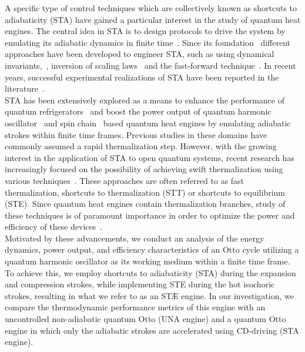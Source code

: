 \documentclass[aps,pra,twocolumn,showpacs,showkeys,groupedaddress,nobalancelastpage,nofootinbib,floatfix,superscriptaddress,longbibliography]{revtex4-2}
\begin{document}
A specific type of control techniques which are collectively known as shortcuts to adiabaticity (STA) have gained a particular interest in the study of quantum heat engines. The central idea in STA is to design protocols to drive the system by emulating its adiabatic dynamics in finite time~\cite{TORRONTEGUI2013117,RevModPhys.91.045001}. Since its foundation~\cite{doi:10.1021/jp030708a,doi:10.1021/jp040647w,Berry_2009,PhysRevLett.104.063002} different approaches have been developed to engineer STA, such as using dynamical invariants,~\cite{PhysRevLett.104.063002,PhysRevA.83.062116}, inversion of scaling laws~\cite{PhysRevA.84.031606,Campo2012} and the fast-forward technique~\cite{doi:10.1098/rspa.2009.0446,PhysRevA.84.043434,PhysRevA.86.013601}. In recent years, successful experimental realizations of STA have been reported in the literature~\cite{doi:10.1126/sciadv.aau5999,https://doi.org/10.1002/qute.201900121,PhysRevApplied.13.044059,Yin2022}.\\

STA has been extensively explored as a means to enhance the performance of quantum refrigerators~\cite{PhysRevB.100.035407,PhysRevResearch.2.023120} and boost the power output of quantum harmonic oscillator~\cite{Campo2014,PhysRevE.98.032121,PhysRevE.99.022110,e18050168} and spin chain~\cite{PhysRevE.99.032108,PhysRevResearch.2.023145,_AKMAK_2021} based quantum heat engines by emulating adiabatic strokes within finite time frames. Previous studies in these domains have commonly assumed a rapid thermalization step. However, with the growing interest in the application of STA to open quantum systems, recent research has increasingly focused on the possibility of achieving swift thermalization using various techniques~\cite{PhysRevA.98.052129,PhysRevLett.122.250402,PhysRevA.100.012126,Alipour2020shortcutsto,PhysRevResearch.2.033178,PhysRevX.10.031015,Suri2018,Dann_2020}. These approaches are often referred to as fast thermalization, shortcuts to thermalization (STT) or shortcuts to equilibrium (STE). Since quantum heat engines contain thermalization branches, study of these techniques is of paramount importance in order to optimize the power and efficiency of these devices~\cite{PhysRevA.100.012126,PhysRevX.10.031015,Suri2018,Dann_2020}.\\

Motivated by these advancements, we conduct an analysis of the energy dynamics, power output, and efficiency characteristics of an Otto cycle utilizing a quantum harmonic oscillator as its working medium within a finite time frame. To achieve this, we employ shortcuts to adiabaticity (STA) during the expansion and compression strokes, while implementing STE during the hot isochoric strokes, resulting in what we refer to as an ST{\AE} engine. In our investigation, we compare the thermodynamic performance metrics of this engine with an uncontrolled non-adiabatic quantum Otto (UNA engine) and a quantum Otto engine in which only the adiabatic strokes are accelerated using CD-driving (STA engine).\\
\end{document}
